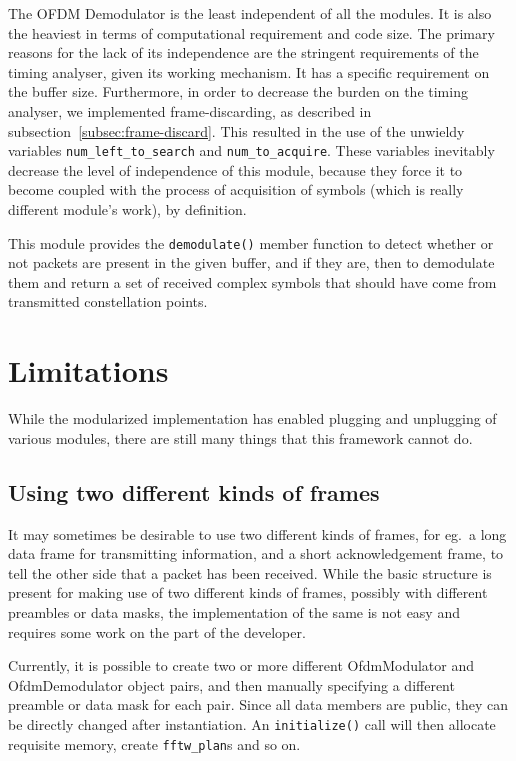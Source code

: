 The OFDM Demodulator is the least independent of all the modules. It is also
the heaviest in terms of computational requirement and code size. The primary
reasons for the lack of its independence are the stringent requirements of the
timing analyser, given its working mechanism. It has a specific requirement on
the buffer size. Furthermore, in order to decrease the burden on the timing
analyser, we implemented frame-discarding, as described in
subsection~\ref{subsec:frame-discard}. This resulted in the use of the
unwieldy variables \lstinline!num_left_to_search! and
\lstinline!num_to_acquire!. These variables inevitably decrease the level of
independence of this module, because they force it to become coupled with the
process of acquisition of symbols (which is really different module's work), by
definition.

This module provides the \lstinline!demodulate()! member function to detect
whether or not packets are present in the given buffer, and if they are, then
to demodulate them and return a set of received complex symbols that should
have come from transmitted constellation points.


\section{Limitations}

While the modularized implementation has enabled plugging and unplugging of
various modules, there are still many things that this framework cannot do.

\subsection{Using two different kinds of frames}

It may sometimes be desirable to use two different kinds of frames, for eg.\ a
long data frame for transmitting information, and a short acknowledgement
frame, to tell the other side that a packet has been received. While the basic
structure is present for making use of two different kinds of frames, possibly
with different preambles or data masks, the implementation of the same is not
easy and requires some work on the part of the developer.

Currently, it is possible to create two or more different OfdmModulator and
OfdmDemodulator object pairs, and then manually specifying a different preamble
or data mask for each pair. Since all data members are public, they can be
directly changed after instantiation. An \lstinline!initialize()! call will
then allocate requisite memory, create \lstinline!fftw_plan!s and so on.

